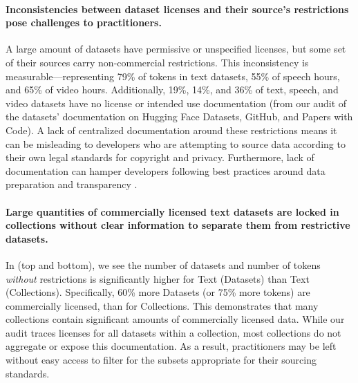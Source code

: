 \vspace{-2mm}
\paragraph{Inconsistencies between dataset licenses and their source's restrictions pose challenges to practitioners.}
A large amount of datasets have permissive or unspecified licenses, but some set of their sources carry non-commercial restrictions.
This inconsistency is measurable---representing 79\% of tokens in text datasets, 55\% of speech hours, and 65\% of video hours.
Additionally, 19\%, 14\%, and 36\% of text, speech, and video datasets have no license or intended use documentation (from our audit of the datasets' documentation on Hugging Face Datasets, GitHub, and Papers with Code).
A lack of centralized documentation around these restrictions means it can be misleading to developers who are attempting to source data according to their own legal standards for copyright and privacy.
Furthermore, lack of documentation can hamper developers following best practices around data preparation and transparency \citep{gebru2021datasheets, bommasani2023foundation}.

\vspace{-2mm}
\paragraph{Large quantities of commercially licensed text datasets are locked in collections without clear information to separate them from restrictive datasets.}
In  (top and bottom), we see the number of datasets and number of tokens \emph{without} restrictions is significantly higher for Text (Datasets) than Text (Collections).
Specifically, 60\% more Datasets (or 75\% more tokens) are commercially licensed, than for Collections.
This demonstrates that many collections contain significant amounts of commercially licensed data.
While our audit traces licenses for all datasets within a collection, most collections do not aggregate or expose this documentation.
As a result, practitioners may be left without easy access to filter for the  subsets appropriate for their sourcing standards.

\vspace{-2mm}
